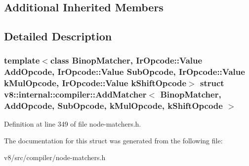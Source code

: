\subsection*{Additional Inherited Members}


\subsection{Detailed Description}
\subsubsection*{template$<$class Binop\+Matcher, Ir\+Opcode\+::\+Value Add\+Opcode, Ir\+Opcode\+::\+Value Sub\+Opcode, Ir\+Opcode\+::\+Value k\+Mul\+Opcode, Ir\+Opcode\+::\+Value k\+Shift\+Opcode$>$\newline
struct v8\+::internal\+::compiler\+::\+Add\+Matcher$<$ Binop\+Matcher, Add\+Opcode, Sub\+Opcode, k\+Mul\+Opcode, k\+Shift\+Opcode $>$}



Definition at line 349 of file node-\/matchers.\+h.



The documentation for this struct was generated from the following file\+:\begin{DoxyCompactItemize}
\item 
v8/src/compiler/node-\/matchers.\+h\end{DoxyCompactItemize}
